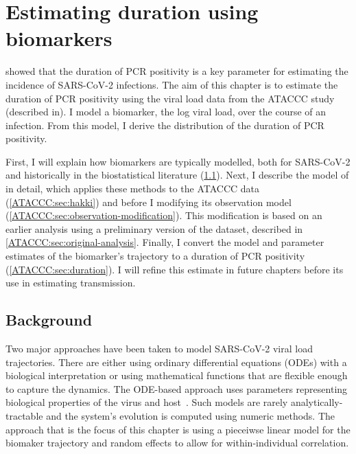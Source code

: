 \documentclass[thesis.tex]{subfiles}
\begin{document}
\ifSubfilesClassLoaded{
  \setcounter{chapter}{3}
}

\chapter{Estimating duration using biomarkers} \label{ATACCC}


 showed that the duration of PCR positivity is a key parameter for estimating the incidence of SARS-CoV-2 infections.
The aim of this chapter is to estimate the duration of PCR positivity using the viral load data from the ATACCC study (described in).
I model a biomarker, the log viral load, over the course of an infection.
From this model, I derive the distribution of the duration of PCR positivity.

First, I will explain how biomarkers are typically modelled, both for SARS-CoV-2 and historically in the biostatistical literature (\cref{ATACCC:sec:background}).
Next, I describe the model of \textcite{hakkiOnset} in detail, which applies these methods to the ATACCC data (\cref{ATACCC:sec:hakki}) and before I modifying its observation model (\cref{ATACCC:sec:observation-modification}).
This modification is based on an earlier analysis using a preliminary version of the dataset, described in \cref{ATACCC:sec:original-analysis}.
Finally, I convert the model and parameter estimates of the biomarker's trajectory to a duration of PCR positivity (\cref{ATACCC:sec:duration}).
I will refine this estimate in future chapters before its use in estimating transmission.

\section{Background} \label{ATACCC:sec:background}

Two major approaches have been taken to model SARS-CoV-2 viral load trajectories.
There are either using ordinary differential equations (ODEs) with a biological interpretation or using mathematical functions that are flexible enough to capture the dynamics.
The ODE-based approach uses parameters representing biological properties of the virus and host~\autocites[e.g.:][]{ejimaEstimation,keVivo,kimQuantitative,goncalvesTiming,perelsonMechanistic}.
Such models are rarely analytically-tractable and the system's evolution is computed using numeric methods.
The approach that is the focus of this chapter is using a pieceiwse linear model for the biomaker trajectory and random effects to allow for within-individual correlation.
\end{document}
